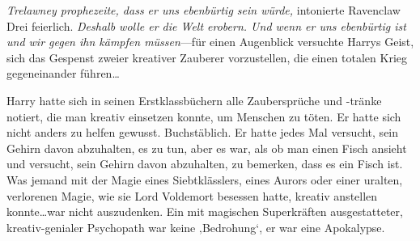 

\emph{Trelawney prophezeite, dass er uns ebenbürtig sein würde,} intonierte Ravenclaw Drei feierlich. \emph{Deshalb wolle er die Welt erobern. Und wenn er uns ebenbürtig ist und wir gegen ihn kämpfen müssen}—für einen Augenblick versuchte Harrys Geist, sich das Gespenst zweier kreativer Zauberer vorzustellen, die einen totalen Krieg gegeneinander führen…

Harry hatte sich in seinen Erstklassbüchern alle Zaubersprüche und -tränke notiert, die man kreativ einsetzen konnte, um Menschen zu töten. Er hatte sich nicht anders zu helfen gewusst. Buchstäblich. Er hatte jedes Mal versucht, sein Gehirn davon abzuhalten, es zu tun, aber es war, als ob man einen Fisch ansieht und versucht, sein Gehirn davon abzuhalten, zu bemerken, dass es ein Fisch ist. Was jemand mit der Magie eines Siebtklässlers, eines Aurors oder einer uralten, verlorenen Magie, wie sie Lord Voldemort besessen hatte, kreativ anstellen konnte…war nicht auszudenken. Ein mit magischen Superkräften ausgestatteter, kreativ-genialer Psychopath war keine ‚Bedrohung‘, er war eine Apokalypse.



